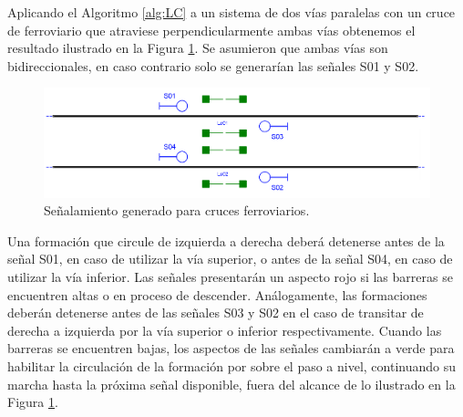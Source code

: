     Aplicando el Algoritmo \ref{alg:LC} a un sistema de dos vías paralelas con un cruce de ferroviario que atraviese perpendicularmente ambas vías obtenemos el resultado ilustrado en la Figura \ref{fig:signal_crossing}. Se asumieron que ambas vías son bidireccionales, en caso contrario solo se generarían las señales S01 y S02.
    
    \begin{figure}[h!]
        \centering
        \includegraphics[width=1\textwidth]{Figuras/crossings.PNG}
        \centering\caption{Señalamiento generado para cruces ferroviarios.}
        \label{fig:signal_crossing}
    \end{figure}
    
    Una formación que circule de izquierda a derecha deberá detenerse antes de la señal S01, en caso de utilizar la vía superior, o antes de la señal S04, en caso de utilizar la vía inferior. Las señales presentarán un aspecto rojo si las barreras se encuentren altas o en proceso de descender. Análogamente, las formaciones deberán detenerse antes de las señales S03 y S02 en el caso de transitar de derecha a izquierda por la vía superior o inferior respectivamente. Cuando las barreras se encuentren bajas, los aspectos de las señales cambiarán a verde para habilitar la circulación de la formación por sobre el paso a nivel, continuando su marcha hasta la próxima señal disponible, fuera del alcance de lo ilustrado en la Figura \ref{fig:signal_crossing}.    